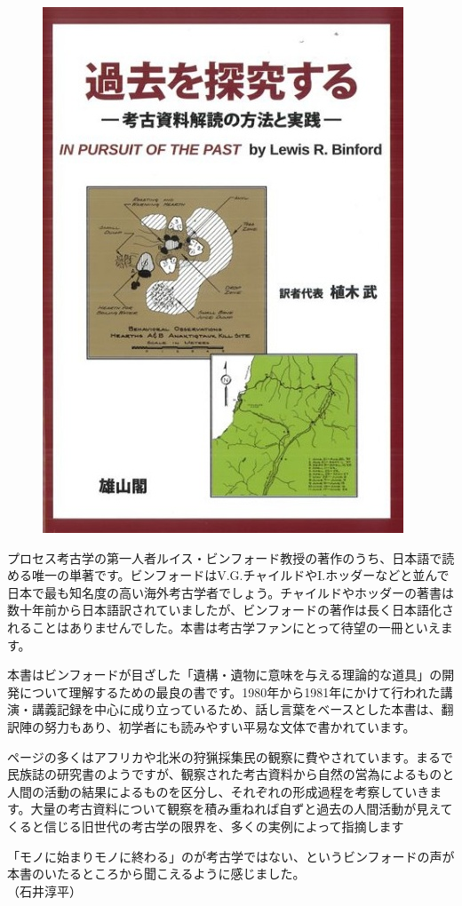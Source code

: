 \documentclass[a4j,11pt,twocolumn,openany]{jsbook}
\begin{document}
\begin{figure}[H]
	\centering
	\includegraphics[width=0.8\linewidth]{fig/09_Shohyo/Binford.jpg}
	\label{}
\end{figure}

プロセス考古学の第一人者ルイス・ビンフォード教授の著作のうち、日本語で読める唯一の単著です。ビンフォードはV.G.チャイルドやI.ホッダーなどと並んで日本で最も知名度の高い海外考古学者でしょう。チャイルドやホッダーの著書は数十年前から日本語訳されていましたが、ビンフォードの著作は長く日本語化されることはありませんでした。本書は考古学ファンにとって待望の一冊といえます。

本書はビンフォードが目ざした「遺構・遺物に意味を与える理論的な道具」の開発について理解するための最良の書です。1980年から1981年にかけて行われた講演・講義記録を中心に成り立っているため、話し言葉をベースとした本書は、翻訳陣の努力もあり、初学者にも読みやすい平易な文体で書かれています。

ページの多くはアフリカや北米の狩猟採集民の観察に費やされています。まるで民族誌の研究書のようですが、観察された考古資料から自然の営為によるものと人間の活動の結果によるものを区分し、それぞれの形成過程を考察していきます。大量の考古資料について観察を積み重ねれば自ずと過去の人間活動が見えてくると信じる旧世代の考古学の限界を、多くの実例によって指摘します

「モノに始まりモノに終わる」のが考古学ではない、というビンフォードの声が本書のいたるところから聞こえるように感じました。\\
\hspace{15zw}（石井淳平）
\end{document}
